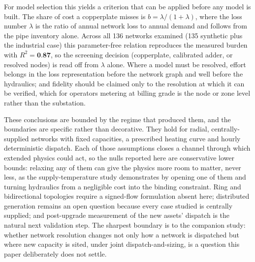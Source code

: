 For model selection this yields a criterion that can be applied before any model is built.
The share of cost a copperplate misses is $b = \lambda/(1+\lambda)$, where the loss number
$\lambda$ is the ratio of annual network loss to annual demand and follows from the pipe
inventory alone. Across all 136 networks examined (135 synthetic plus the industrial case)
this parameter-free relation reproduces the measured burden with $R^2 = \textbf{0.87}$, so the
screening decision (copperplate, calibrated adder, or resolved nodes) is read off from
$\lambda$ alone. Where a model must be resolved, effort belongs in the loss representation
before the network graph and well before the hydraulics; and fidelity should be claimed only to
the resolution at which it can be verified, which for operators metering at billing grade is
the node or zone level rather than the substation.

These conclusions are bounded by the regime that produced them, and the boundaries are
specific rather than decorative. They hold for radial, centrally-supplied networks with
fixed capacities, a prescribed heating curve and hourly deterministic dispatch. Each of
those assumptions closes a channel through which extended physics could act, so the nulls
reported here are conservative lower bounds: relaxing any of them can give the physics more
room to matter, never less, as the supply-temperature study demonstrates by opening one of
them and turning hydraulics from a negligible cost into the binding constraint. Ring and
bidirectional topologies require a signed-flow formulation absent here; distributed
generation remains an open question because every case studied is centrally supplied; and
post-upgrade measurement of the new assets' dispatch is the natural next validation step.
The sharpest boundary is to the companion study: whether network resolution changes not only
how a network is dispatched but where new capacity is sited, under joint
dispatch-and-sizing, is a question this paper deliberately does not settle.

